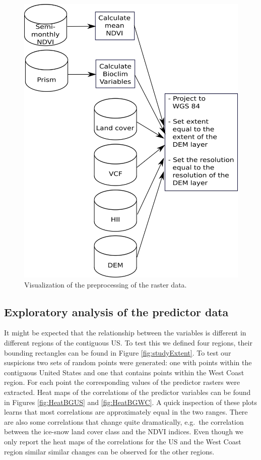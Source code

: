 \begin{figure}[!htb]
\centering
\includegraphics[scale=0.35]{VectorGraphics/DataScheme.png}
\caption{\label{fig:DataCommonlyUsedInSpeciesDistributionModels:DataScheme}Visualization of the preprocessing of the raster data.}
\end{figure}


\subsection{Exploratory analysis of the predictor data}
\label{sec:ExploratoryPredictor}
It might be expected that the relationship between the variables is different in different regions of the contiguous US. To test this we defined four regions, their bounding rectangles can be found in Figure \ref{fig:studyExtent}. To test our suspicions two sets of random points were generated: one with points within the contiguous United States and one that contains points within the West Coast region. For each point the corresponding values of the predictor rasters were extracted. Heat maps of the correlations of the predictor variables can be found in Figures \ref{fig:HeatBGUS} and \ref{fig:HeatBGWC}. A quick inspection of these plots learns that most correlations are approximately equal in the two ranges. There are also some correlations that change quite dramatically, e.g.\ the correlation between the ice-snow land cover class and the NDVI indices. Even though we only report the heat maps of the correlations for the US and the West Coast region similar similar changes can be observed for the other regions. \\

